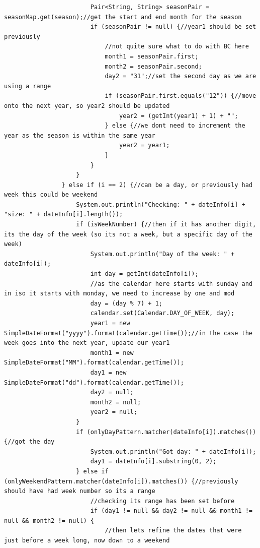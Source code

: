 \begin{lstlisting}
                        Pair<String, String> seasonPair = seasonMap.get(season);//get the start and end month for the season
                        if (seasonPair != null) {//year1 should be set previously
                            //not quite sure what to do with BC here
                            month1 = seasonPair.first;
                            month2 = seasonPair.second;
                            day2 = "31";//set the second day as we are using a range
                            if (seasonPair.first.equals("12")) {//move onto the next year, so year2 should be updated
                                year2 = (getInt(year1) + 1) + "";
                            } else {//we dont need to increment the year as the season is within the same year
                                year2 = year1;
                            }
                        }
                    }
                } else if (i == 2) {//can be a day, or previously had week this could be weekend
                    System.out.println("Checking: " + dateInfo[i] + "size: " + dateInfo[i].length());
                    if (isWeekNumber) {//then if it has another digit, its the day of the week (so its not a week, but a specific day of the week)
                        System.out.println("Day of the week: " + dateInfo[i]);
                        int day = getInt(dateInfo[i]);
                        //as the calendar here starts with sunday and in iso it starts with monday, we need to increase by one and mod
                        day = (day % 7) + 1;
                        calendar.set(Calendar.DAY_OF_WEEK, day);
                        year1 = new SimpleDateFormat("yyyy").format(calendar.getTime());//in the case the week goes into the next year, update our year1
                        month1 = new SimpleDateFormat("MM").format(calendar.getTime());
                        day1 = new SimpleDateFormat("dd").format(calendar.getTime());
                        day2 = null;
                        month2 = null;
                        year2 = null;
                    }
                    if (onlyDayPattern.matcher(dateInfo[i]).matches()) {//got the day
                        System.out.println("Got day: " + dateInfo[i]);
                        day1 = dateInfo[i].substring(0, 2);
                    } else if (onlyWeekendPattern.matcher(dateInfo[i]).matches()) {//previously should have had week number so its a range
                        //checking its range has been set before
                        if (day1 != null && day2 != null && month1 != null && month2 != null) {
                            //then lets refine the dates that were just before a week long, now down to a weekend

\end{lstlisting}
